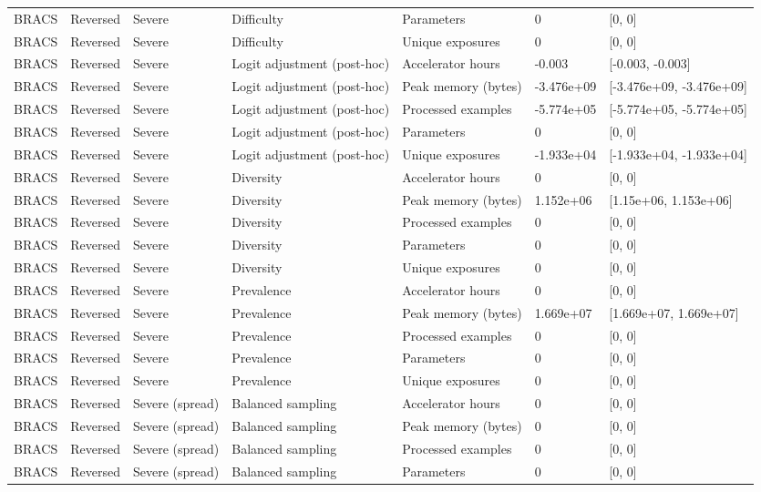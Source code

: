 \begin{longtable}{lllllll}
BRACS & Reversed & Severe & Difficulty & Parameters & 0 & [0, 0] \\
BRACS & Reversed & Severe & Difficulty & Unique exposures & 0 & [0, 0] \\
BRACS & Reversed & Severe & Logit adjustment (post-hoc) & Accelerator hours & -0.003 & [-0.003, -0.003] \\
BRACS & Reversed & Severe & Logit adjustment (post-hoc) & Peak memory (bytes) & -3.476e+09 & [-3.476e+09, -3.476e+09] \\
BRACS & Reversed & Severe & Logit adjustment (post-hoc) & Processed examples & -5.774e+05 & [-5.774e+05, -5.774e+05] \\
BRACS & Reversed & Severe & Logit adjustment (post-hoc) & Parameters & 0 & [0, 0] \\
BRACS & Reversed & Severe & Logit adjustment (post-hoc) & Unique exposures & -1.933e+04 & [-1.933e+04, -1.933e+04] \\
BRACS & Reversed & Severe & Diversity & Accelerator hours & 0 & [0, 0] \\
BRACS & Reversed & Severe & Diversity & Peak memory (bytes) & 1.152e+06 & [1.15e+06, 1.153e+06] \\
BRACS & Reversed & Severe & Diversity & Processed examples & 0 & [0, 0] \\
BRACS & Reversed & Severe & Diversity & Parameters & 0 & [0, 0] \\
BRACS & Reversed & Severe & Diversity & Unique exposures & 0 & [0, 0] \\
BRACS & Reversed & Severe & Prevalence & Accelerator hours & 0 & [0, 0] \\
BRACS & Reversed & Severe & Prevalence & Peak memory (bytes) & 1.669e+07 & [1.669e+07, 1.669e+07] \\
BRACS & Reversed & Severe & Prevalence & Processed examples & 0 & [0, 0] \\
BRACS & Reversed & Severe & Prevalence & Parameters & 0 & [0, 0] \\
BRACS & Reversed & Severe & Prevalence & Unique exposures & 0 & [0, 0] \\
BRACS & Reversed & Severe (spread) & Balanced sampling & Accelerator hours & 0 & [0, 0] \\
BRACS & Reversed & Severe (spread) & Balanced sampling & Peak memory (bytes) & 0 & [0, 0] \\
BRACS & Reversed & Severe (spread) & Balanced sampling & Processed examples & 0 & [0, 0] \\
BRACS & Reversed & Severe (spread) & Balanced sampling & Parameters & 0 & [0, 0] \\

\end{longtable}
